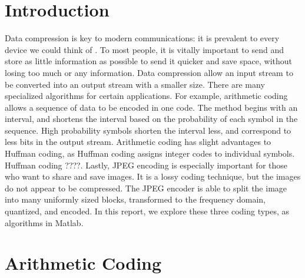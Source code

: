 \documentclass[11pt,a4paper,table]{article}
\begin{document}
\setcounter{page}{2}

\section{Introduction}
Data compression is key to modern communications: it is prevalent to every device we could think of \cite{Salomon2007}. To most people, it is vitally important to send and store as little information as possible to send it quicker and save space, without losing too much or any information. Data compression allow an input stream to be converted into an output stream with a smaller size. There are many specialized algorithms for certain applications. For example, arithmetic coding allows a sequence of data to be encoded in one code. The method begins with an interval, and shortens the interval based on the probability of each symbol in the sequence. High probability symbols shorten the interval less, and correspond to less bits in the output stream. Arithmetic coding has slight advantages to Huffman coding, as Huffman coding assigns integer codes to individual symbols. Huffman coding ????. Lastly, JPEG encoding is especially important for those who want to share and save images. It is a lossy coding technique, but the images do not appear to be compressed. The JPEG encoder is able to split the image into many uniformly sized blocks, transformed to the frequency domain, quantized, and encoded. In this report, we explore these three coding types, as algorithms in Matlab.

\section{Arithmetic Coding}
\end{document}
